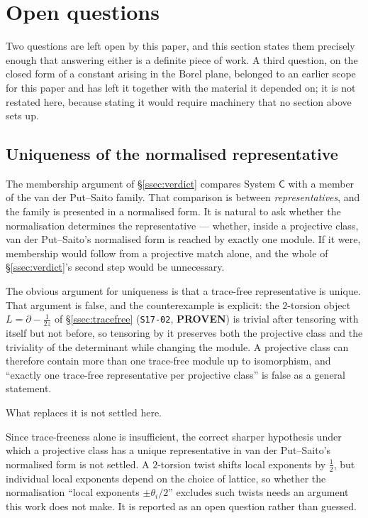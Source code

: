 \section{Open questions}\label{sec:open}

Two questions are left open by this paper, and this section states them
precisely enough that answering either is a definite piece of work. A third
question, on the closed form of a constant arising in the Borel plane, belonged
to an earlier scope for this paper and has left it together with the material
it depended on; it is not restated here, because stating it would require
machinery that no section above sets up.

\subsection{Uniqueness of the normalised representative}\label{ssec:gauge}

The membership argument of \S\ref{ssec:verdict} compares System
$\mathsf C$ with a member of the van der Put--Saito family. That comparison is
between \emph{representatives}, and the family is presented in a normalised
form. It is natural to ask whether the normalisation determines the
representative --- whether, inside a projective class, van der Put--Saito's
normalised form is reached by exactly one module. If it were, membership would
follow from a projective match alone, and the whole of \S\ref{ssec:verdict}'s
second step would be unnecessary.

The obvious argument for uniqueness is that a trace-free representative is
unique. That argument is false, and the counterexample is explicit: the
$2$-torsion object $L=\partial-\tfrac{1}{2z}$ of \S\ref{ssec:tracefree}
(\texttt{S17-02}, \textbf{PROVEN}) is trivial after tensoring with itself but
not before, so tensoring by it preserves both the projective class and the
triviality of the determinant while changing the module. A projective class can
therefore contain more than one trace-free module up to isomorphism, and
``exactly one trace-free representative per projective class'' is false as a
general statement.

What replaces it is not settled here.

\begin{remark}
Since trace-freeness alone is insufficient, the correct sharper hypothesis
under which a projective class has a unique representative in van der
Put--Saito's normalised form is not settled. A $2$-torsion twist shifts local
exponents by $\tfrac12$, but individual local exponents depend on the choice of
lattice, so whether the normalisation ``local exponents $\pm\theta_i/2$''
excludes such twists needs an argument this work does not make. It is reported
as an open question rather than guessed.
\end{remark}

